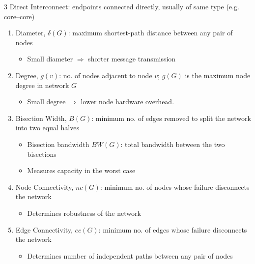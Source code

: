 \documentclass[12pt, a4paper]{article}
\begin{document}
\begin{multicols*}{3}
Direct Interconnect: endpoints connected directly, usually of same type (e.g. core--core) 
\begin{enumerate}[\roman*.]
  \item Diameter, $\delta(G)$: maximum shortest-path distance between any pair of nodes
    \begin{itemize}[leftmargin=*]\vspace{3pt}
      \item Small diameter $\Rightarrow$ shorter message transmission
    \end{itemize}
  \item Degree, $g(v)$: no. of nodes adjacent to node $v$; $g(G)$ is the maximum node degree in network $G$
    \begin{itemize}[leftmargin=*]\vspace{3pt}
      \item Small degree $\Rightarrow$ lower node hardware overhead.
    \end{itemize}
  \item Bisection Width, $B(G)$: minimum no. of edges removed to split the network into two equal halves
    \begin{itemize}[leftmargin=*]\vspace{3pt}
      \item Bisection bandwidth $BW(G)$: total bandwidth between the two bisections 
      \item Measures capacity in the worst case 
    \end{itemize}
  \item Node Connectivity, $nc(G)$: minimum no. of nodes whose failure disconnects the network
    \begin{itemize}[leftmargin=*]\vspace{3pt}
      \item Determines robustness of the network
    \end{itemize}
  \item Edge Connectivity, $ec(G)$: minimum no. of edges whose failure disconnects the network
    \begin{itemize}[leftmargin=*]\vspace{3pt}
      \item Determines number of independent paths between any pair of nodes
    \end{itemize}
\end{enumerate}


\end{multicols*}
\end{document}
